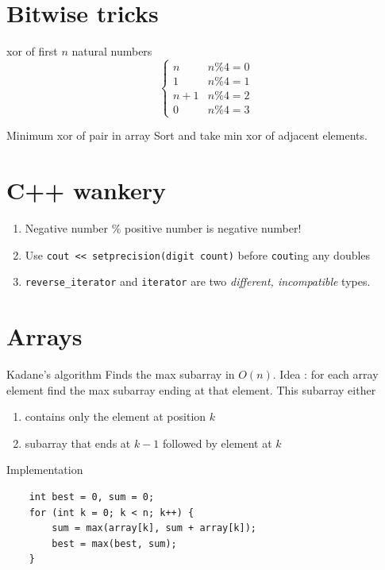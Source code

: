 \documentclass[titlepage, 12pt]{book}
\begin{document}
\chapter{Bitwise tricks}

\begin{algorithm}{xor of first $n$ natural numbers}{}
  \[ \begin{cases}
    n     & n \% 4 = 0 \\
    1     & n \% 4 = 1 \\
    n + 1 & n \% 4 = 2 \\
    0     & n \% 4 = 3
  \end{cases}
\]
\end{algorithm}

\begin{algorithm}{Minimum xor of pair in array}{}
  Sort and take min xor of adjacent elements.
\end{algorithm}

\chapter{C++ wankery}
\begin{enumerate}
  \item Negative number \% positive number is negative number!
  \item Use \verb|cout << setprecision(digit count)| before \verb|cout|ing any
    doubles
  \item \verb|reverse_iterator| and \verb|iterator| are two \textit{different,
    incompatible} types.
\end{enumerate}

\chapter{Arrays}

\begin{algorithm}{Kadane's algorithm}{}
    Finds the max subarray in $O(n)$. Idea : for each array element find the max
    subarray ending at that element. This subarray either
    \begin{enumerate}
        \item contains only the element at position $k$
        \item subarray that ends at $k - 1$ followed by element at $k$
    \end{enumerate}
    Implementation
    \begin{verbatim}
    int best = 0, sum = 0;
    for (int k = 0; k < n; k++) {
        sum = max(array[k], sum + array[k]);
        best = max(best, sum);
    }
    \end{verbatim}
\end{algorithm}
\end{document}
